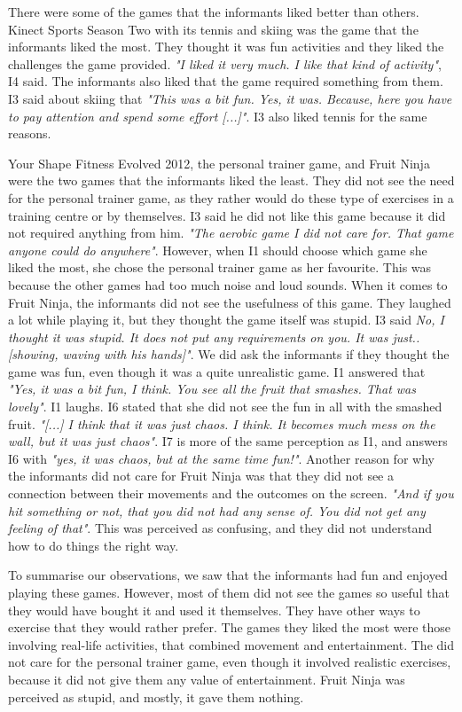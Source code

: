 There were some of the games that the informants liked better than others. Kinect Sports Season Two with its tennis and skiing was the game that the informants liked the most. They thought it was fun activities and they liked the challenges the game provided. \emph{"I liked it very much. I like that kind of activity"}, I4 said. The informants also liked that the game required something from them. I3 said about skiing that \emph{"This was a bit fun. Yes, it was. Because, here you have to pay attention and spend some effort [...]"}. I3 also liked tennis for the same reasons.  

Your Shape Fitness Evolved 2012, the personal trainer game, and Fruit Ninja were the two games that the informants liked the least. They did not see the need for the personal trainer game, as they rather would do these type of exercises in a training centre or by themselves. I3 said he did not like this game because it did not required anything from him. \emph{"The aerobic game I did not care for. That game anyone could do anywhere"}. However, when I1 should choose which game she liked the most, she chose the personal trainer game as her favourite. This was because the other games had too much noise and loud sounds. When it comes to Fruit Ninja, the informants did not see the usefulness of this game. They laughed a lot while playing it, but they thought the game itself was stupid. I3 said \emph{No, I thought it was stupid. It does not put any requirements on you. It was just.. [showing, waving with his hands]"}. We did ask the informants if they thought the game was fun, even though it was a quite unrealistic game. I1 answered that \emph{"Yes, it was a bit fun, I think. You see all the fruit that smashes. That was lovely"}. I1 laughs. I6 stated that she did not see the fun in all with the smashed fruit. \emph{"[...] I think that it was just chaos. I think. It becomes much mess on the wall, but it was just chaos"}. I7 is more of the same perception as I1, and answers I6 with \emph{"yes, it was chaos, but at the same time fun!"}. Another reason for why the informants did not care for Fruit Ninja was that they did not see a connection between their movements and the outcomes on the screen. \emph{"And if you hit something or not, that you did not had any sense of. You did not get any feeling of that"}. This was perceived as confusing, and they did not understand how to do things the right way. 

To summarise our observations, we saw that the informants had fun and enjoyed playing these games. However, most of them did not see the games so useful that they would have bought it and used it themselves. They have other ways to exercise that they would rather prefer. The games they liked the most were those involving real-life activities, that combined movement and entertainment. The did not care for the personal trainer game, even though it involved realistic exercises, because it did not give them any value of entertainment. Fruit Ninja was perceived as stupid, and mostly, it gave them nothing. 

